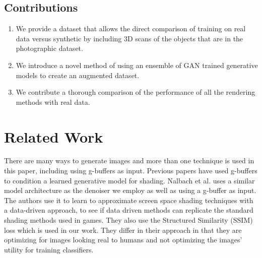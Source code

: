 \documentclass[10pt,twocolumn,letterpaper]{article}
\newcommand{\tompson}[1]{{\color{green} JT: #1}}
\begin{document}
\subsection{Contributions}
\begin{enumerate}
\item We provide a dataset that allows the direct comparison of training on real data versus synthetic by including 3D scans of the objects that are in the photographic dataset.
\item We introduce a novel method of using an ensemble of GAN trained generative models to create an augmented dataset.
\item We contribute a thorough comparison of the performance of all the rendering methods with real data.
\end{enumerate}
\section{Related Work}

There are many ways to generate images and more than one technique is used in this paper, including using g-buffers as input. Previous papers have used g-buffers to condition a learned generative model for shading. Nalbach et al. \cite{DBLP:journals/corr/NalbachAMSR16} uses a similar model architecture as the denoiser we employ as well as using a g-buffer as input.  The authors use it to learn to approximate screen space shading techniques with a data-driven approach, to see if data driven methods can replicate the standard shading methods used in games.  They also use the Structured Similarity (SSIM) loss which is used in our work. They differ in their approach in that they are optimizing for images looking real to humans and not optimizing the images' utility for training classifiers.
\end{document}
